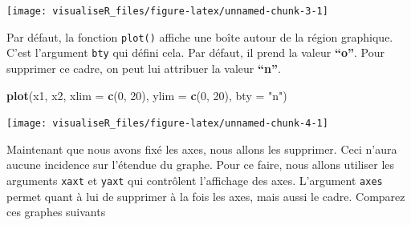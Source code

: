 \documentclass[]{article}
\newenvironment{Shaded}{\begin{snugshade}}{\end{snugshade}}
\newcommand{\DataTypeTok}[1]{\textcolor[rgb]{0.13,0.29,0.53}{#1}}
\newcommand{\DecValTok}[1]{\textcolor[rgb]{0.00,0.00,0.81}{#1}}
\newcommand{\KeywordTok}[1]{\textcolor[rgb]{0.13,0.29,0.53}{\textbf{#1}}}
\newcommand{\NormalTok}[1]{#1}
\newcommand{\StringTok}[1]{\textcolor[rgb]{0.31,0.60,0.02}{#1}}
\begin{document}
\begin{center}\texttt{[image: visualiseR\_files/figure-latex/unnamed-chunk-3-1]} \end{center}

Par défaut, la fonction \texttt{plot()} affiche une boîte autour de la région graphique. C'est l'argument \texttt{bty} qui défini cela. Par défaut, il prend la valeur \textbf{``o''}. Pour supprimer ce cadre, on peut lui attribuer la valeur \textbf{``n''}.

\begin{Shaded}
\begin{Highlighting}[]
\KeywordTok{plot}\NormalTok{(x1, x2, }\DataTypeTok{xlim =} \KeywordTok{c}\NormalTok{(}\DecValTok{0}\NormalTok{, }\DecValTok{20}\NormalTok{), }\DataTypeTok{ylim =} \KeywordTok{c}\NormalTok{(}\DecValTok{0}\NormalTok{, }\DecValTok{20}\NormalTok{), }\DataTypeTok{bty =} \StringTok{"n"}\NormalTok{)}
\end{Highlighting}
\end{Shaded}

\begin{center}\texttt{[image: visualiseR\_files/figure-latex/unnamed-chunk-4-1]} \end{center}

Maintenant que nous avons fixé les axes, nous allons les supprimer. Ceci n'aura aucune incidence sur l'étendue du graphe. Pour ce faire, nous allons utiliser les arguments \texttt{xaxt} et \texttt{yaxt} qui contrôlent l'affichage des axes. L'argument \texttt{axes} permet quant à lui de supprimer à la fois les axes, mais aussi le cadre. Comparez ces graphes suivants
\end{document}
